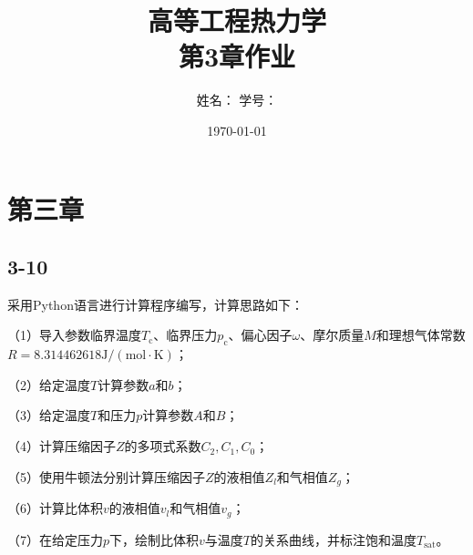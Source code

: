 \documentclass[12pt,a4paper]{article}
\title{高等工程热力学\\第3章作业}
\author{姓名：\underline{\hspace{4cm}} \quad 学号：\underline{\hspace{4cm}}}
\date{\today}
\begin{document}
\renewcommand{\maketitle}{}
\maketitle

\section*{第三章}

\subsection*{3-10}
采用Python语言进行计算程序编写，计算思路如下：

（1）导入参数临界温度$T_\mathrm{c}$、临界压力$p_\mathrm{c}$、偏心因子$\omega$、摩尔质量$M$和理想气体常数$R=8.314462618\mathrm{J/(mol\cdot K)}$；

（2）给定温度$T$计算参数$a$和$b$；

（3）给定温度$T$和压力$p$计算参数$A$和$B$；

（4）计算压缩因子$Z$的多项式系数$C_2, C_1, C_0$；

（5）使用牛顿法分别计算压缩因子$Z$的液相值$Z_l$和气相值$Z_g$；

（6）计算比体积$v$的液相值$v_l$和气相值$v_g$；

（7）在给定压力$p$下，绘制比体积$v$与温度$T$的关系曲线，并标注饱和温度$T_\mathrm{sat}$。
\end{document}
